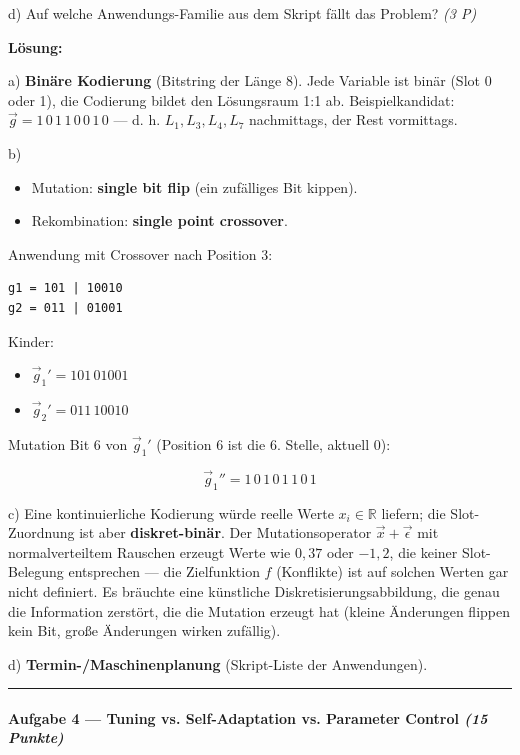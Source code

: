 \documentclass[11pt, a4paper]{article}
\begin{document}
d) Auf welche Anwendungs-Familie aus dem Skript fällt das Problem? \textit{(3 P)}


\textbf{Lösung:}


a) \textbf{Binäre Kodierung} (Bitstring der Länge 8). Jede Variable ist binär (Slot 0 oder 1), die Codierung bildet den Lösungsraum 1:1 ab. Beispielkandidat: $\vec g = 1\,0\,1\,1\,0\,0\,1\,0$ — d. h. $L_1, L_3, L_4, L_7$ nachmittags, der Rest vormittags.


b)

\begin{itemize}
  \item Mutation: \textbf{single bit flip} (ein zufälliges Bit kippen).
  \item Rekombination: \textbf{single point crossover}.
\end{itemize}

Anwendung mit Crossover nach Position 3:


\begin{lstlisting}
g1 = 101 | 10010
g2 = 011 | 01001
\end{lstlisting}


Kinder:

\begin{itemize}
  \item $\vec g_1' = 101\,01001$
  \item $\vec g_2' = 011\,10010$
\end{itemize}

Mutation Bit 6 von $\vec g_1'$ (Position 6 ist die 6. Stelle, aktuell 0):

\[
\vec g_1'' = 1\,0\,1\,0\,1\,1\,0\,1
\]


c) Eine kontinuierliche Kodierung würde reelle Werte $x_i \in \mathbb R$ liefern; die Slot-Zuordnung ist aber \textbf{diskret-binär}. Der Mutationsoperator $\vec x + \vec\epsilon$ mit normalverteiltem Rauschen erzeugt Werte wie $0{,}37$ oder $-1{,}2$, die keiner Slot-Belegung entsprechen — die Zielfunktion $f$ (Konflikte) ist auf solchen Werten gar nicht definiert. Es bräuchte eine künstliche Diskretisierungsabbildung, die genau die Information zerstört, die die Mutation erzeugt hat (kleine Änderungen flippen kein Bit, große Änderungen wirken zufällig).


d) \textbf{Termin-/Maschinenplanung} (Skript-Liste der Anwendungen).



\noindent\textcolor{rulegray}{\rule{\linewidth}{0.4pt}}


\paragraph{Aufgabe 4 — Tuning vs. Self-Adaptation vs. Parameter Control \textit{(15 Punkte)}}\mbox{}\\[2pt]
\end{document}
